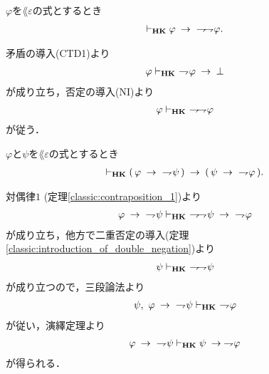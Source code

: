 	\begin{screen}
		\begin{thm}[二重否定の導入]
		\label{classic:introduction_of_double_negation}
			$\varphi$を$\lang{\varepsilon}$の式とするとき
			\begin{align}
				\vdash_{{\scriptsize \mbox{{\bf HK}}}} \varphi \hspace{0.25em}\rightarrow\hspace{0.25em}\ \rightharpoondown\hspace{-0.25em} \rightharpoondown\hspace{-0.25em} \varphi.
			\end{align}
		\end{thm}
	\end{screen}
	
	\begin{sketch}
		矛盾の導入(CTD1)より
		\begin{align}
			\varphi \vdash_{{\scriptsize \mbox{{\bf HK}}}}\ \rightharpoondown\hspace{-0.25em} \varphi \hspace{0.25em}\rightarrow\hspace{0.25em} \bot
		\end{align}
		が成り立ち，否定の導入(NI)より
		\begin{align}
			\varphi \vdash_{{\scriptsize \mbox{{\bf HK}}}}\ \rightharpoondown\hspace{-0.25em} \rightharpoondown\hspace{-0.25em} \varphi
		\end{align}
		が従う．
		\QED
	\end{sketch}
	
	\begin{screen}
		\begin{thm}[対偶律$2$]\label{classic:contraposition_2}
			$\varphi$と$\psi$を$\lang{\varepsilon}$の式とするとき
			\begin{align}
				\provable{\mbox{{\bf HK}}} (\, \varphi \rarrow\ \negation \psi\, )
				\rarrow (\, \psi \rarrow\ \negation \varphi\, ).
			\end{align}
		\end{thm}
	\end{screen}
	
	\begin{sketch}
		対偶律$1$ (定理\ref{classic:contraposition_1})より
		\begin{align}
			\varphi \rarrow\ \negation \psi \provable{\mbox{{\bf HK}}}\ 
			\negation \negation \psi \rarrow\ \negation \varphi
		\end{align}
		が成り立ち，他方で二重否定の導入(定理\ref{classic:introduction_of_double_negation})より
		\begin{align}
			\psi \vdash_{{\scriptsize \mbox{{\bf HK}}}}\ \rightharpoondown\hspace{-0.25em} \rightharpoondown\hspace{-0.25em} \psi
		\end{align}
		が成り立つので，三段論法より
		\begin{align}
			\psi,\ \varphi \rarrow\ \negation \psi \provable{\mbox{{\bf HK}}}\ 
			\negation \varphi
		\end{align}
		が従い，演繹定理より
		\begin{align}
			\varphi \hspace{0.25em}\rightarrow\hspace{0.25em}\ \rightharpoondown\hspace{-0.25em} \psi \vdash_{{\scriptsize \mbox{{\bf HK}}}}
			\psi \hspace{0.25em}\rightarrow\hspace{0.25em} \rightharpoondown\hspace{-0.25em} \varphi
		\end{align}
		が得られる．
		\QED
	\end{sketch}
	

